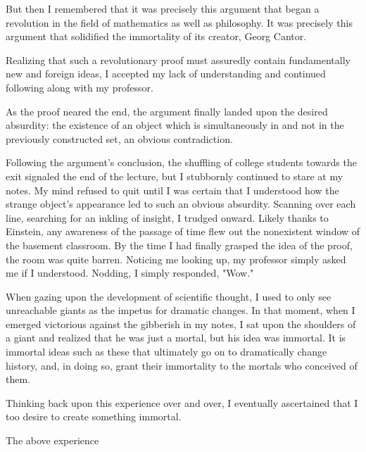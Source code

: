 \documentclass[12pt]{article}
\begin{document}
But then I remembered that it was precisely this argument that began a revolution in the field of mathematics as well as philosophy. It was precisely this argument that solidified the immortality of its creator, Georg Cantor.

Realizing that such a revolutionary proof must assuredly contain fundamentally new and foreign ideas, I accepted my lack of understanding and continued following along with my professor.

As the proof neared the end, the argument finally landed upon the desired absurdity: the existence of an object which is simultaneously in and not in the previously constructed set, an obvious contradiction.

Following the argument's conclusion, the shuffling of college students towards the exit signaled the end of the lecture, but I stubbornly continued to stare at my notes. My mind refused to quit until I was certain that I understood how the strange object's appearance led to such an obvious absurdity. Scanning over each line, searching for an inkling of insight, I trudged onward. Likely thanks to Einstein, any awareness of the passage of time flew out the nonexistent window of the basement classroom. By the time I had finally grasped the idea of the proof, the room was quite barren. Noticing me looking up, my professor simply asked me if I understood. Nodding, I simply responded, "Wow."

When gazing upon the development of scientific thought, I used to only see unreachable giants as the impetus for dramatic changes. In that moment, when I emerged victorious against the gibberish in my notes, I sat upon the shoulders of a giant and realized that he was just a mortal, but his idea was immortal. It is immortal ideas such as these that ultimately go on to dramatically change history, and, in doing so, grant their immortality to the mortals who conceived of them.

Thinking back upon this experience over and over, I eventually ascertained that I too desire to create something immortal.

The above experience 
\end{document}
